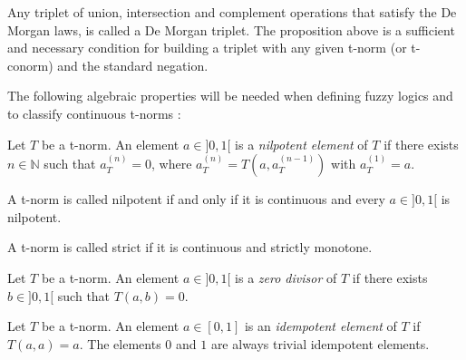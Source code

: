 Any triplet of union, intersection and complement operations that satisfy the De Morgan laws, is called a De Morgan triplet\cite[p.~52]{HistoryFL2017}. The proposition above is a sufficient and necessary condition for building a triplet with any given t-norm (or t-conorm) and the standard negation.\\






The following algebraic properties will be needed when defining fuzzy logics and to classify continuous t-norms \cite[Def.~2.1 \& 2.13]{Klement2000}:

\begin{definition}
Let $T$ be a t-norm. An element $a \in ]0,1[$ is a \emph{nilpotent element} of $T$ if there exists $n \in \mathbb{N}$ such that $a_T^{(n)} = 0$, where $a_T^{(n)} = T(a, a_T^{(n-1)})$ with $a_T^{(1)}=a$.

A t-norm is called nilpotent if and only if it is continuous and every $a\in ]0,1[$ is nilpotent.
\end{definition}

\begin{definition}
  A t-norm is called strict if it is continuous and strictly monotone.
\end{definition}


\begin{definition}
Let $T$ be a t-norm. An element $a \in ]0,1[$ is a \emph{zero divisor} of $T$ if there exists $b \in ]0,1[$ such that $T(a,b)=0$.
\end{definition}

\begin{definition}
  Let $T$ be a t-norm. An element $a \in [0,1]$ is an \emph{idempotent element} of $T$ if $T(a,a)=a$. The elements $0$ and $1$ are always trivial idempotent elements.
  \end{definition}
  

